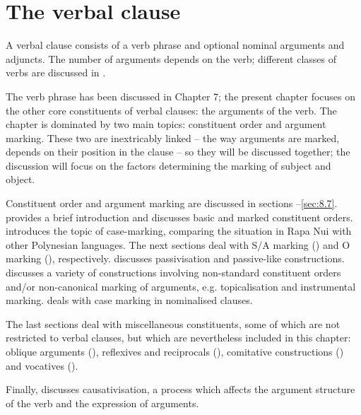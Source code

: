 \chapter[The verbal clause]{The verbal clause}\label{ch:8}
A verbal clause consists of a verb phrase and optional nominal arguments and adjuncts. The number of arguments depends on the verb; different classes of verbs are discussed in . 

The verb phrase has been discussed in Chapter 7; the present chapter focuses on the other core constituents of verbal clauses: the arguments of the verb. The chapter is dominated by two main topics: constituent order and argument marking. These two are inextricably linked – the way arguments are marked, depends on their position in the clause – so they will be discussed together; the discussion will focus on the factors determining the marking of subject and object. 

Constituent order and argument marking are discussed in sections –\ref{sec:8.7}.  provides a brief introduction and discusses basic and marked constituent orders.  introduces the topic of case-marking, comparing the situation in Rapa Nui with other Polynesian languages. The next sections deal with S/A marking () and O marking (), respectively.  discusses passivisation and passive-like constructions.  discusses a variety of constructions involving non-standard constituent orders and/or non-canonical marking of arguments, e.g. topicalisation and instrumental marking.  deals with case marking in nominalised clauses. 

The last sections deal with miscellaneous constituents, some of which are not restricted to verbal clauses, but which are nevertheless included in this chapter: oblique arguments (), reflexives and reciprocals (), comitative constructions () and vocatives (). 

Finally,  discusses causativisation, a process which affects the argument structure of the verb and the expression of arguments. 

